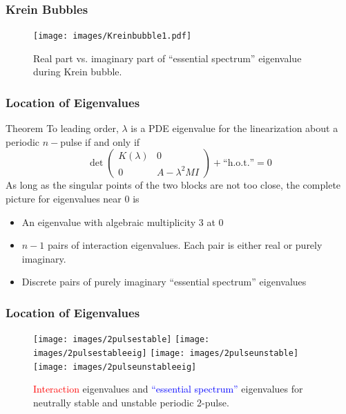 \documentclass[16pt]{beamer}
\begin{document}
\begin{frame}
	\frametitle{Krein Bubbles}
	\fontsize{16}{7.2}\selectfont
		\begin{figure}
		\begin{center}
		\texttt{[image: images/Kreinbubble1.pdf]}
		\end{center}
		\caption{Real part vs. imaginary part of ``essential spectrum'' eigenvalue during Krein bubble.}
		\end{figure}
\end{frame}

\begin{frame}
\frametitle{Location of Eigenvalues} 
	\fontsize{14}{7.2}\selectfont
    \begin{block}{Theorem}
    To leading order, $\lambda$ is a PDE eigenvalue for the linearization about a periodic $n-$pulse if and only if 
    \[
    \det\begin{pmatrix}K(\lambda) & 0 \\ 0 & A - \lambda^2  M I \end{pmatrix} + \text{``h.o.t.''} = 0
    \]
    As long as the singular points of the two blocks are not too close, the complete picture for eigenvalues near 0 is
    \begin{itemize}
    	\item An eigenvalue with algebraic multiplicity 3 at 0
    	\item $n-1$ pairs of interaction eigenvalues. Each pair is either real or purely imaginary.
    	\item Discrete pairs of purely imaginary ``essential spectrum'' eigenvalues
    \end{itemize}
    \end{block}
\end{frame}

\begin{frame}
	\frametitle{Location of Eigenvalues}
	\fontsize{16}{7.2}\selectfont
		\begin{figure}
		\begin{center}
		\texttt{[image: images/2pulsestable]}
		\texttt{[image: images/2pulsestableeig]}
		\texttt{[image: images/2pulseunstable]}
		\texttt{[image: images/2pulseunstableeig]}
		\end{center}
		\caption{\textcolor{red}{Interaction} eigenvalues and \textcolor{blue}{``essential spectrum''} eigenvalues for neutrally stable and unstable periodic 2-pulse.}
		\end{figure}
\end{frame}
\end{document}
